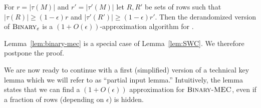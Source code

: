 \begin{lemma}\label{lem:binary-mec}
   For $r = |\tau(M)|$ and $r' = |\tau'(M)|$ let $R,R'$ be sets of rows such that $|\tau(R)| \ge (1-\epsilon) r$ and $|\tau'(R')| \ge (1-\epsilon) r'$.
   Then the derandomized version of $\textsc{Binary}_{\epsilon}$ is a $(1+O(\epsilon))$-approximation algorithm for \BMEC. 
\end{lemma}

Lemma~\ref{lem:binary-mec} is a special case of Lemma~\ref{lem:SWC}.
We therefore postpone the proof.

We are now ready to continue with a first (simplified) version of a technical key lemma which we will refer to as ``partial input lemma.''
Intuitively, the lemma states that we can find a $(1+O(\epsilon))$ approximation for $\BMEC$, even if a fraction of rows (depending on $\epsilon$) is hidden.


